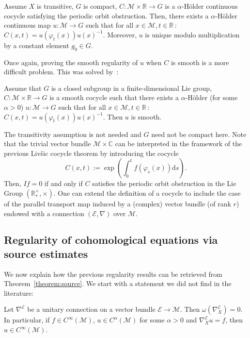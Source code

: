 \documentclass[AHL,Unicode,longabstracts,published]{cedram}
\newcommand{\C}{\mathbb{C}}
\newcommand{\R}{\mathbb{R}}
\newcommand{\mc}{\mathcal}
\newcommand{\M}{\mathcal{M}}
\newcommand{\E}{\mathcal{E}}
\newcommand{\dd}{\mathrm{d}}
\begin{document}
\begin{theo}
Assume $X$ is transitive, $G$ is compact, $C : \mc{M} \times \R \rightarrow G$ is a $\alpha$-H\"older continuous cocycle satisfying the periodic orbit obstruction. Then, there exists a $\alpha$-H\"older continuous map $u : \M \rightarrow G$ such that for all $x \in \M, t \in \R\,$: $C(x,t) = u(\varphi_t(x))u(x)^{-1}$. Moreover, $u$ is unique modulo multiplication by a constant element $g_0 \in G$.
\end{theo}

Once again, proving the smooth regularity of $u$ when $C$ is smooth is a more difficult problem. This was solved by~\cite[Theorem~2.4]{Nitica-Torok-98}:

\begin{theo}\label{theorem:livsic-smooth-cocycle}
Assume that $G$ is a closed subgroup in a finite-dimensional Lie group, $C : \mc{M} \times \R \rightarrow G$ is a smooth cocycle such that there exists a $\alpha$-H\"older (for some $\alpha > 0$) $u : \M \rightarrow G$ such that for all $x \in \M, t \in \R\,$: $C(x,t) = u(\varphi_t(x))u(x)^{-1}$. Then $u$ is smooth.
\end{theo}

The transitivity assumption is not needed and $G$ need not be compact here. Note that the trivial vector bundle $\M \times \C$ can be interpreted in the framework of the previous Liv{\v s}ic cocycle theorem by introducing the cocycle
\[
C(x,t) := \exp\left(\int_0^t f(\varphi_s(x)) \dd s \right).
\]
Then, $If = 0$ if and only if $C$ satisfies the periodic orbit obstruction in the Lie Group $(\R^+_*,\times)$. One can extend the definition of a cocycle to include the case of the parallel transport map induced by a (complex) vector bundle (of rank $r$) endowed with a connection $(\mc{E},\nabla)$ over $\M$.



\subsection{Regularity of cohomological equations via source estimates}


We now explain how the previous regularity results can be retrieved from Theorem~\ref{theorem:source}. We start with a statement we did not find in the literature:

\begin{theo}\label{theorem:smoothness}
Let $\nabla^{\E}$ be a unitary connection on a vector bundle $\E \rightarrow \M$. Then $\omega(\nabla^{\E}_X)=0$. In particular, if $f \in C^\infty(\M)$, $u \in C^\alpha(\M)$ for some $\alpha > 0$ and $\nabla^{\E}_X u = f$, then $u \in C^\infty(\M)$.
\end{theo}
\end{document}
